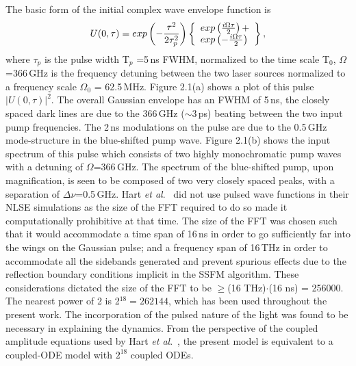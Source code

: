 The basic form of the initial complex wave envelope function is 
\begin {equation}
U(0,\tau) = exp \left( - {\tau^2 \over 2\tau_p^2} \right)
\left\{ 
\begin{array}{l}
exp\left( {i\Omega\tau \over 2} \right) + \\
exp\left( - {i\Omega\tau \over 2} \right)
\end{array}
\right\} ,
\end{equation}
where $\tau_p$ is the pulse width T$_p$ =5\,ns FWHM, normalized to the time scale 
T$_0$, $\Omega$=366\,GHz is the frequency detuning between the two laser 
sources normalized to a frequency scale $\Omega_0$ = 62.5\,MHz.  Figure 2.1(a) 
shows a plot of this pulse $|U(0,\tau)|^2$. The overall Gaussian envelope 
has an FWHM of 5\,ns, the closely spaced dark lines are due to the 366\,GHz 
($\sim$3\,ps) beating between the two input pump frequencies. The 2\,ns 
modulations on the pulse are due to the 0.5\,GHz mode-structure in the 
blue-shifted pump wave. Figure 2.1(b) shows the input spectrum of this pulse 
which consists of two highly monochromatic pump waves with a detuning of 
$\Omega$=366\,GHz. The spectrum of the blue-shifted pump, upon magnification, 
is seen to be composed of two very closely spaced peaks, with a separation of 
$\Delta\nu$=0.5\,GHz. Hart {\it et al}.\ \cite{hart1} did not use pulsed 
wave functions in their NLSE simulations as the size of the FFT required to do 
so made it computationally prohibitive at that time. The size of the FFT was 
chosen such that it would accommodate a time span of 16\,ns in order to go 
sufficiently far into the wings on the Gaussian pulse; and a frequency span of 
16\,THz in order to accommodate all the sidebands generated and prevent 
spurious effects due to the reflection boundary conditions implicit in the 
SSFM algorithm. These considerations dictated the size of the FFT to be 
$\geq$(16 THz)$\cdot$(16 ns) = 256000. The nearest power of 2 is 
2$^{18} = 262144$, which has been used throughout the present work. The 
incorporation of the pulsed nature of the light was found to be necessary in 
explaining the dynamics. From the perspective of the coupled amplitude 
equations used by Hart {\it et al}.\ \cite{hart1}, the present model is equivalent 
to a coupled-ODE model with $2^{18}$ coupled ODEs. 

